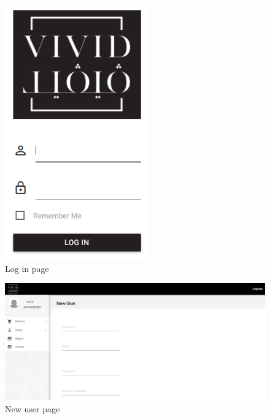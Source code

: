 \documentclass[a4paper,12pt]{article}
\begin{document}
\newpage
\begin{figure}[h!]
\centering\includegraphics[height=1.1\textwidth]{f.png}
\caption{Log in page}
\end{figure}
\newpage
\begin{figure}[h!]
\centering\includegraphics[height=1.1\textwidth]{g.png}
\caption{New user page}
\end{figure}
\end{document}
